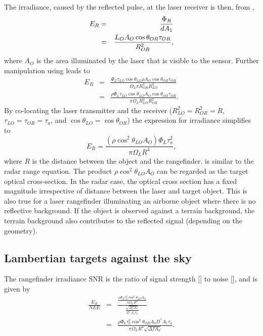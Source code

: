 
The irradiance, caused by the reflected pulse, at the laser receiver is then, from ,
\begin{eqnarray}
E_R&=&\frac{\Phi_R}{d A_1}\nonumber \\
&=&\frac{L_O A_O \cos\theta_{OR}\tau_{OR}}{R_{OR}^2},
\end{eqnarray}
where $A_O$ is the area illuminated by the laser that is visible to the
sensor. Further manipulation using  leads to
\begin{eqnarray}
E_R&=&\frac{\Phi_L \tau_{LO}\cos\theta_{LO}\rho A_O \cos\theta_{OR}\tau_{OR}}
{\Omega_L \pi R^2_{OR}R^2_{LO}}\nonumber \\
&=&\frac{
\rho \Phi_L \tau_{LO} \cos\theta_{LO} A_O \cos\theta_{OR} \tau_{OR}
}{
\pi \Omega_L R^2_{LO}R^2_{OR}
}.
\end{eqnarray}
By co-locating the laser transmitter and the receiver ($R^2_{LO}=R^2_{OR}=R$, $\tau_{LO}=\tau_{OR}=\tau_a$, and $\cos\theta_{LO}= \cos\theta_{OR}$) the expression for irradiance simplifies to
\begin{equation}
E_R = \frac{
(\rho \cos^2\theta_{LO} A_O)
\Phi_L \tau^2_{a}
}{
\pi \Omega_L R^4
},\label{radar}
\end{equation}
where $R$ is the distance between the object and the rangefinder.
 is similar to the radar range equation. The product $\rho\cos^2\theta_{LO} A_O$ can be regarded as the target optical cross-section. In the radar case, the optical cross section has a fixed magnitude irrespective of distance between the laser and target object. This is also true for a laser rangefinder illuminating an airborne object where there is no reflective background.  If the object is observed against a terrain background, the terrain background also contributes to the reflected signal (depending on the geometry).



\subsection{Lambertian targets against the sky}

\noindent
The rangefinder irradiance SNR is the ratio of signal strength
[] to noise [], and is given by
\begin{eqnarray}
\frac{E_R}{NEE}&=&\frac{
\frac{
\rho \Phi_L \tau^2_{a} \cos^2\theta_{LO} A_O
}{
\pi \Omega_L R^4 }
}{\frac{\sqrt{\Delta f A_d}}{D^\ast A_1 \tau_a}}\\
&=&\frac{\rho\Phi_L
\tau_{a}^2 \cos^2\theta_{OR}A_0D^\ast A_1 \tau_a} { \pi\Omega_L R^4
\sqrt{\Delta f A_d}}.
\end{eqnarray}

